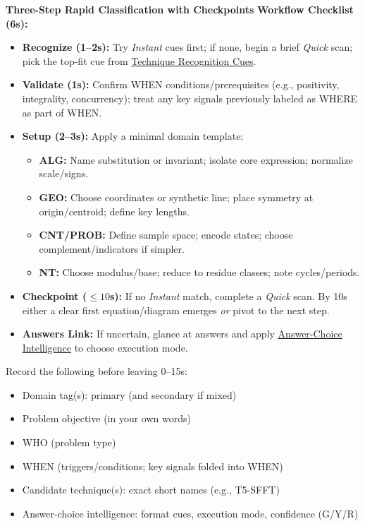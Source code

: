 \documentclass{article}
\newcommand{\immediateaction}[1]{\textbf{\textcolor{classifyred}{#1}}}
\begin{document}
\begin{classifybox}{\immediateaction{Three-Step Rapid Classification with Checkpoints}}
\textbf{Workflow Checklist (6s):}
\begin{itemize}[nosep]
\item \textbf{Recognize (1--2s):} Try \textit{Instant} cues first; if none, begin a brief \textit{Quick} scan; pick the top-fit cue from \hyperlink{ircues}{Technique Recognition Cues}.
\item \textbf{Validate (1s):} Confirm WHEN conditions/prerequisites (e.g., positivity, integrality, concurrency); treat any key signals previously labeled as WHERE as part of WHEN.
\item \textbf{Setup (2--3s):} Apply a minimal domain template:
  \begin{itemize}[nosep]
  \item \textbf{ALG:} Name substitution or invariant; isolate core expression; normalize scale/signs.
  \item \textbf{GEO:} Choose coordinates or synthetic line; place symmetry at origin/centroid; define key lengths.
  \item \textbf{CNT/PROB:} Define sample space; encode states; choose complement/indicators if simpler.
  \item \textbf{NT:} Choose modulus/base; reduce to residue classes; note cycles/periods.
  \end{itemize}
\item \textbf{Checkpoint ($\leq 10$s):} If no \textit{Instant} match, complete a \textit{Quick} scan. By 10s either a clear first equation/diagram emerges \emph{or} pivot to the next step.
\item \textbf{Answers Link:} If uncertain, glance at answers and apply \hyperlink{answer-test-50}{Answer-Choice Intelligence} to choose execution mode.
\end{itemize}

\vspace{2mm}
\begin{tcolorbox}[colback=green!5!white,colframe=green!75!black,title={\textbf{Classification Capture Checklist [0--15s]}}]
Record the following before leaving 0--15s:
\begin{itemize}[nosep]
\item Domain tag(s): primary (and secondary if mixed)
\item Problem objective (in your own words)
\item WHO (problem type)
\item WHEN (triggers/conditions; key signals folded into WHEN)
\item Candidate technique(s): exact short names (e.g., T5-SFFT)
\item Answer-choice intelligence: format cues, execution mode, confidence (G/Y/R)
\end{itemize}
\end{tcolorbox}


\end{classifybox}
\end{document}
